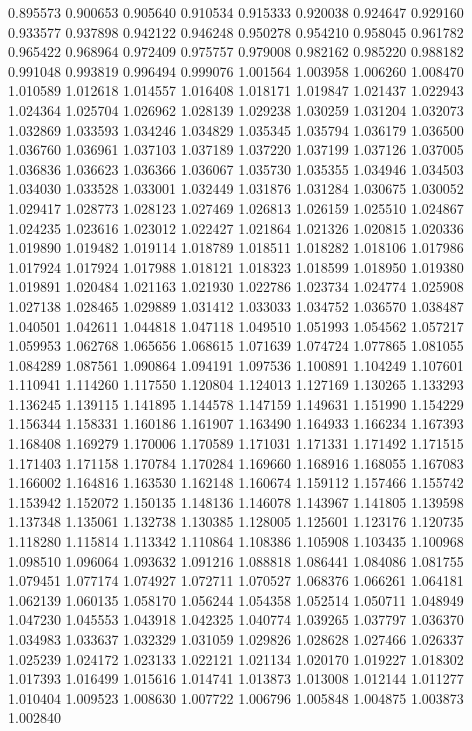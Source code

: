 0.895573
0.900653
0.905640
0.910534
0.915333
0.920038
0.924647
0.929160
0.933577
0.937898
0.942122
0.946248
0.950278
0.954210
0.958045
0.961782
0.965422
0.968964
0.972409
0.975757
0.979008
0.982162
0.985220
0.988182
0.991048
0.993819
0.996494
0.999076
1.001564
1.003958
1.006260
1.008470
1.010589
1.012618
1.014557
1.016408
1.018171
1.019847
1.021437
1.022943
1.024364
1.025704
1.026962
1.028139
1.029238
1.030259
1.031204
1.032073
1.032869
1.033593
1.034246
1.034829
1.035345
1.035794
1.036179
1.036500
1.036760
1.036961
1.037103
1.037189
1.037220
1.037199
1.037126
1.037005
1.036836
1.036623
1.036366
1.036067
1.035730
1.035355
1.034946
1.034503
1.034030
1.033528
1.033001
1.032449
1.031876
1.031284
1.030675
1.030052
1.029417
1.028773
1.028123
1.027469
1.026813
1.026159
1.025510
1.024867
1.024235
1.023616
1.023012
1.022427
1.021864
1.021326
1.020815
1.020336
1.019890
1.019482
1.019114
1.018789
1.018511
1.018282
1.018106
1.017986
1.017924
1.017924
1.017988
1.018121
1.018323
1.018599
1.018950
1.019380
1.019891
1.020484
1.021163
1.021930
1.022786
1.023734
1.024774
1.025908
1.027138
1.028465
1.029889
1.031412
1.033033
1.034752
1.036570
1.038487
1.040501
1.042611
1.044818
1.047118
1.049510
1.051993
1.054562
1.057217
1.059953
1.062768
1.065656
1.068615
1.071639
1.074724
1.077865
1.081055
1.084289
1.087561
1.090864
1.094191
1.097536
1.100891
1.104249
1.107601
1.110941
1.114260
1.117550
1.120804
1.124013
1.127169
1.130265
1.133293
1.136245
1.139115
1.141895
1.144578
1.147159
1.149631
1.151990
1.154229
1.156344
1.158331
1.160186
1.161907
1.163490
1.164933
1.166234
1.167393
1.168408
1.169279
1.170006
1.170589
1.171031
1.171331
1.171492
1.171515
1.171403
1.171158
1.170784
1.170284
1.169660
1.168916
1.168055
1.167083
1.166002
1.164816
1.163530
1.162148
1.160674
1.159112
1.157466
1.155742
1.153942
1.152072
1.150135
1.148136
1.146078
1.143967
1.141805
1.139598
1.137348
1.135061
1.132738
1.130385
1.128005
1.125601
1.123176
1.120735
1.118280
1.115814
1.113342
1.110864
1.108386
1.105908
1.103435
1.100968
1.098510
1.096064
1.093632
1.091216
1.088818
1.086441
1.084086
1.081755
1.079451
1.077174
1.074927
1.072711
1.070527
1.068376
1.066261
1.064181
1.062139
1.060135
1.058170
1.056244
1.054358
1.052514
1.050711
1.048949
1.047230
1.045553
1.043918
1.042325
1.040774
1.039265
1.037797
1.036370
1.034983
1.033637
1.032329
1.031059
1.029826
1.028628
1.027466
1.026337
1.025239
1.024172
1.023133
1.022121
1.021134
1.020170
1.019227
1.018302
1.017393
1.016499
1.015616
1.014741
1.013873
1.013008
1.012144
1.011277
1.010404
1.009523
1.008630
1.007722
1.006796
1.005848
1.004875
1.003873
1.002840
